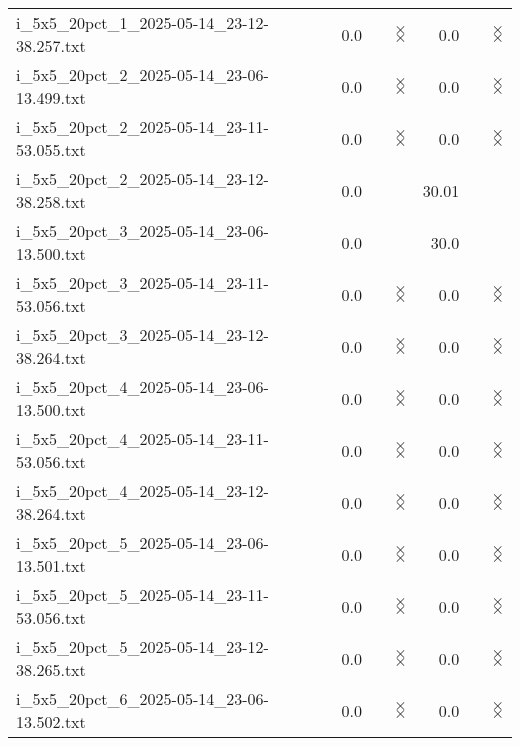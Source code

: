 \documentclass{article}
\begin{document}
\begin{center}
\begin{tabular}{lrrrr}
i\_5x5\_20pct\_1\_2025-05-14\_23-12-38.257.txt & 0.0 & 
$\times$
$\times$
 & 0.0 & 
$\times$
$\times$
\\
i\_5x5\_20pct\_2\_2025-05-14\_23-06-13.499.txt & 0.0 & 
$\times$
$\times$
 & 0.0 & 
$\times$
$\times$
\\
i\_5x5\_20pct\_2\_2025-05-14\_23-11-53.055.txt & 0.0 & 
$\times$
$\times$
 & 0.0 & 
$\times$
$\times$
\\
i\_5x5\_20pct\_2\_2025-05-14\_23-12-38.258.txt & 0.0 & 
 & 30.01 & 
\\
i\_5x5\_20pct\_3\_2025-05-14\_23-06-13.500.txt & 0.0 & 
 & 30.0 & 
\\
i\_5x5\_20pct\_3\_2025-05-14\_23-11-53.056.txt & 0.0 & 
$\times$
$\times$
 & 0.0 & 
$\times$
$\times$
\\
i\_5x5\_20pct\_3\_2025-05-14\_23-12-38.264.txt & 0.0 & 
$\times$
$\times$
 & 0.0 & 
$\times$
$\times$
\\
i\_5x5\_20pct\_4\_2025-05-14\_23-06-13.500.txt & 0.0 & 
$\times$
$\times$
 & 0.0 & 
$\times$
$\times$
\\
i\_5x5\_20pct\_4\_2025-05-14\_23-11-53.056.txt & 0.0 & 
$\times$
$\times$
 & 0.0 & 
$\times$
$\times$
\\
i\_5x5\_20pct\_4\_2025-05-14\_23-12-38.264.txt & 0.0 & 
$\times$
$\times$
 & 0.0 & 
$\times$
$\times$
\\
i\_5x5\_20pct\_5\_2025-05-14\_23-06-13.501.txt & 0.0 & 
$\times$
$\times$
 & 0.0 & 
$\times$
$\times$
\\
i\_5x5\_20pct\_5\_2025-05-14\_23-11-53.056.txt & 0.0 & 
$\times$
$\times$
 & 0.0 & 
$\times$
$\times$
\\
i\_5x5\_20pct\_5\_2025-05-14\_23-12-38.265.txt & 0.0 & 
$\times$
$\times$
 & 0.0 & 
$\times$
$\times$
\\
i\_5x5\_20pct\_6\_2025-05-14\_23-06-13.502.txt & 0.0 & 
$\times$
$\times$
 & 0.0 & 
$\times$
$\times$
\\
\hline\end{tabular}
\end{center}
\end{document}
